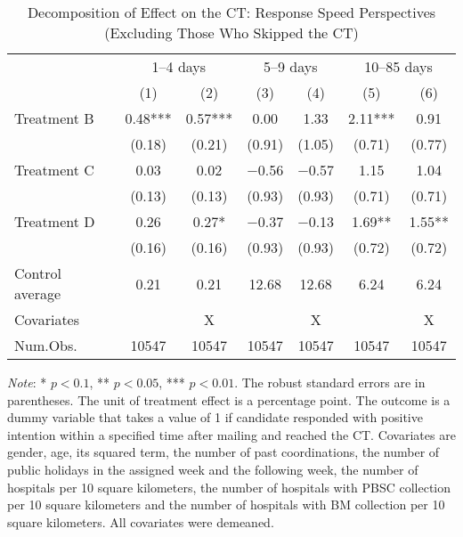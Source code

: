 \documentclass[12pt, a4paper]{article}
\begin{document}
\begin{table}[H]

\caption{\label{tab:lm-test-time-decompose-noskip}Decomposition of Effect on the CT: Response Speed Perspectives (Excluding Those Who Skipped the CT)}
\centering
\fontsize{8}{10}\selectfont
\begin{threeparttable}
\begin{tabular}[t]{lcccccc}
\toprule
\multicolumn{1}{c}{ } & \multicolumn{2}{c}{1--4 days} & \multicolumn{2}{c}{5--9 days} & \multicolumn{2}{c}{10--85 days} \\
\cmidrule(l{3pt}r{3pt}){2-3} \cmidrule(l{3pt}r{3pt}){4-5} \cmidrule(l{3pt}r{3pt}){6-7}
  & (1) & (2) & (3) & (4) & (5) & (6)\\
\midrule
Treatment B & \num{0.48}*** & \num{0.57}*** & \num{0.00} & \num{1.33} & \num{2.11}*** & \num{0.91}\\
 & (\num{0.18}) & (\num{0.21}) & (\num{0.91}) & (\num{1.05}) & (\num{0.71}) & (\num{0.77})\\
Treatment C & \num{0.03} & \num{0.02} & \num{-0.56} & \num{-0.57} & \num{1.15} & \num{1.04}\\
 & (\num{0.13}) & (\num{0.13}) & (\num{0.93}) & (\num{0.93}) & (\num{0.71}) & (\num{0.71})\\
Treatment D & \num{0.26} & \num{0.27}* & \num{-0.37} & \num{-0.13} & \num{1.69}** & \num{1.55}**\\
 & (\num{0.16}) & (\num{0.16}) & (\num{0.93}) & (\num{0.93}) & (\num{0.72}) & (\num{0.72})\\
\midrule
Control average & 0.21 & 0.21 & 12.68 & 12.68 & 6.24 & 6.24\\
Covariates &  & X &  & X &  & X\\
Num.Obs. & \num{10547} & \num{10547} & \num{10547} & \num{10547} & \num{10547} & \num{10547}\\
\bottomrule
\end{tabular}
\begin{tablenotes}
\item \emph{Note}: * $p < 0.1$, ** $p < 0.05$, *** $p < 0.01$. The robust standard errors are in parentheses. The unit of treatment effect is a percentage point. The outcome is a dummy variable that takes a value of 1 if candidate responded with positive intention within a specified time after mailing and reached the CT. Covariates are gender, age, its squared term, the number of past coordinations, the number of public holidays in the assigned week and the following week, the number of hospitals per 10 square kilometers, the number of hospitals with PBSC collection per 10 square kilometers and the number of hospitals with BM collection per 10 square kilometers. All covariates were demeaned.
\end{tablenotes}
\end{threeparttable}
\end{table}
\end{document}
